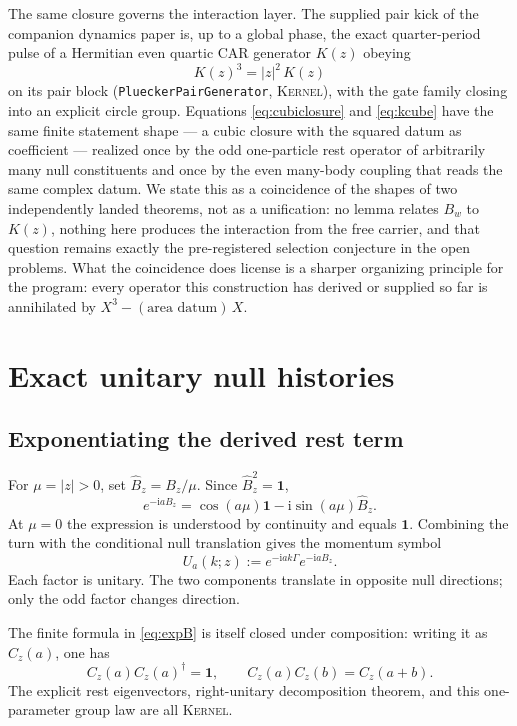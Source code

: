 \documentclass[11pt]{article}
\newcommand{\Kernel}{\textcolor{kernelcolor}{\textsc{Kernel}}}
\newcommand{\ii}{\mathrm{i}}
\newcommand{\id}{\mathbf{1}}
\begin{document}
The same closure governs the interaction layer.  The supplied pair kick
of the companion dynamics paper is, up to a global phase, the exact
quarter-period pulse of a Hermitian even quartic CAR generator $K(z)$
obeying
\begin{equation}\label{eq:kcube}
  K(z)^3=|z|^2\,K(z)
\end{equation}
on its pair block (\texttt{PlueckerPairGenerator}, \Kernel{}), with the
gate family closing into an explicit circle group.  Equations
\eqref{eq:cubiclosure} and \eqref{eq:kcube} have the same finite
statement shape --- a cubic closure with the squared datum as
coefficient ---
realized once by the odd one-particle rest operator of arbitrarily many
null constituents and once by the even many-body coupling that reads the
same complex datum.  We state this as a coincidence of the shapes of two
independently landed theorems, not as a unification: no lemma relates
$B_w$ to $K(z)$, nothing here produces the
interaction from the free carrier, and that question remains exactly the
pre-registered selection conjecture in the open problems.  What the
coincidence does license is a sharper organizing principle for the
program: every operator this construction has derived or supplied so far
is annihilated by $X^3-(\text{area datum})\,X$.

\section{Exact unitary null histories}

\subsection{Exponentiating the derived rest term}

For $\mu=|z|>0$, set $\widehat B_z=B_z/\mu$.  Since
$\widehat B_z^2=\id$,
\begin{equation}\label{eq:expB}
 e^{-\ii aB_z}
 =\cos(a\mu)\id-\ii\sin(a\mu)\widehat B_z.
\end{equation}
At $\mu=0$ the expression is understood by continuity and equals $\id$.
Combining the turn with the conditional null translation gives the momentum
symbol
\begin{equation}\label{eq:walk}
 U_a(k;z):=e^{-\ii ak\Gamma}e^{-\ii aB_z}.
\end{equation}
Each factor is unitary.  The two components translate in opposite null
directions; only the odd factor changes direction.

The finite formula in \eqref{eq:expB} is itself closed under composition:
writing it as $C_z(a)$, one has
\begin{equation}
 C_z(a)C_z(a)^\dagger=\id,
 \qquad
 C_z(a)C_z(b)=C_z(a+b).
\end{equation}
The explicit rest eigenvectors, right-unitary decomposition theorem, and this
one-parameter group law are all \Kernel{}.
\end{document}
